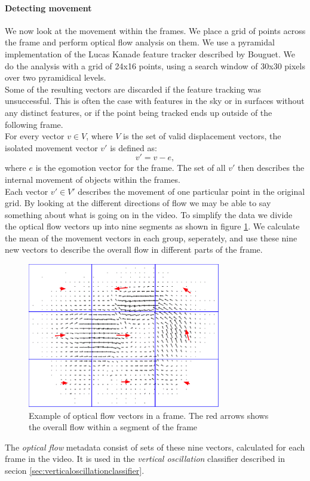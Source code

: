 \paragraph{Detecting movement}
%
We now look at the movement within the frames. We place a grid of points across the frame and perform optical flow analysis on them. We use a pyramidal implementation of the Lucas Kanade feature tracker described by Bouguet\cite{Bouguet2000}. We do the analysis with a grid of 24x16 points, using a search window of 30x30 pixels over two pyramidical levels.\\
Some of the resulting vectors are discarded if the feature tracking was unsuccessful. This is often the case with features in the sky or in surfaces without any distinct features, or if the point being tracked ends up outside of the following frame.\\
For every vector $v \in V$, where $V$ is the set of valid displacement vectors, the isolated movement vector $v'$ is defined as:
\begin{equation}
v' = v - e,
\end{equation}
where $e$ is the egomotion vector for the frame. The set of all $v'$ then describes the internal movement of objects within the frames.\\
Each vector $v' \in V'$ describes the movement of one particular point in the original grid. By looking at the different directions of flow we may be able to say something about what is going on in the video. To simplify the data we divide the optical flow vectors up into nine segments as shown in figure \ref{fig:opticalflow}. We calculate the mean of the movement vectors in each group, seperately, and use these nine new vectors to describe the overall flow in different parts of the frame.
%
\begin{figure}
     \centering
     \includegraphics[width=0.75\textwidth]{img/optical_flow.png}
     \caption{Example of optical flow vectors in a frame. The red arrows shows the overall flow within a segment of the frame}\label{fig:opticalflow}
\end{figure}
%
The \textit{optical flow} metadata consist of sets of these nine vectors, calculated for each frame in the video. It is used in the \textit{vertical oscillation} classifier described in secion \ref{sec:verticaloscillationclassifier}.
%
